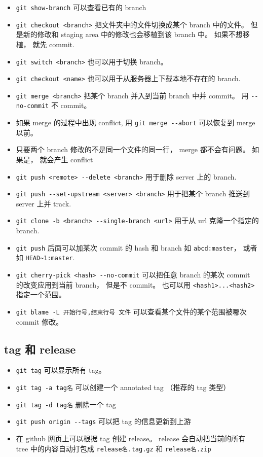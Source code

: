 \begin{itemize}
\item \verb|git show-branch| 可以查看已有的 branch 
\item \verb|git checkout <branch>| 把文件夹中的文件切换成某个 branch 中的文件。 但是新的修改和 staging area 中的修改也会移植到该 branch 中。 如果不想移植， 就先 commit.
\item \verb|git switch <branch>| 也可以用于切换 branch。
\item \verb|git checkout <name>| 也可以用于从服务器上下载本地不存在的 branch.
\item \verb|git merge <branch>| 把某个 branch 并入到当前 branch 中并 commit。 用 \verb|--no-commit| 不 commit。
\item 如果 merge 的过程中出现 conflict, 用 \verb|git merge --abort| 可以恢复到 merge 以前。
\item 只要两个 branch 修改的不是同一个文件的同一行， merge 都不会有问题。 如果是， 就会产生 conflict



\item \verb|git push <remote> --delete <branch>| 用于删除 server 上的 branch.
\item \verb|git push --set-upstream <server> <branch>| 用于把某个 branch 推送到 server 上并 track.


\item \verb|git clone -b <branch> --single-branch <url>| 用于从 url 克隆一个指定的 branch.
\item \verb|git push| 后面可以加某次 commit 的 hash 和 branch 如 \verb|abcd:master|， 或者如 \verb|HEAD~1:master|.

\item \verb|git cherry-pick <hash> --no-commit| 可以把任意 branch 的某次 commit 的改变应用到当前 branch， 但是不 commit。 也可以用 \verb|<hash1>...<hash2>| 指定一个范围。
\item \verb|git blame -L 开始行号,结束行号 文件|  可以查看某个文件的某个范围被哪次 commit 修改。
\end{itemize}

\subsection{tag 和 release}
\begin{itemize}
\item \verb|git tag| 可以显示所有 tag。
\item \verb|git tag -a tag名| 可以创建一个 annotated tag （推荐的 tag 类型）
\item \verb|git tag -d tag名| 删除一个 tag
\item \verb|git push origin --tags| 可以把 tag 的信息更新到上游
\item 在 github 网页上可以根据 tag 创建 release。 release 会自动把当前的所有 tree 中的内容自动打包成 \verb|release名.tag.gz| 和 \verb|release名.zip|
\end{itemize}

